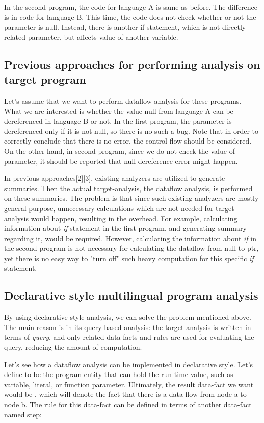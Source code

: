 In the second program, the code for language A is same as before. The
difference is in code for language B. This time, the code does not check whether
or not the parameter is null. Instead, there is another if-statement, which is
not directly related parameter, but affects value of another variable.

\subsection{Previous approaches for performing analysis on target program}

Let's assume that we want to perform dataflow analysis for these programs.
What we are interested is whether the value null from language A can be
dereferenced in language B or not. In the first program, the parameter is
dereferenced only if it is not null, so there is no such a bug. Note that in
order to correctly conclude that there is no error, the control flow should be
considered. On the other hand, in second program, since we do not check the
value of parameter, it should be reported that null dereference error might
happen.

In previous approaches[2][3], existing analyzers are utilized to generate
summaries. Then the actual target-analysis, the dataflow analysis, is performed
on these summaries. The problem is that since such existing analyzers are
mostly general purpose, unnecessary calculations which are not needed for
target-analysis would happen, resulting in the overhead. For example,
calculating information about \textit{if} statement in the first program, and
generating summary regarding it, would be required. However, calculating the
information about \textit{if} in the second program is not necessary for
calculating the dataflow from null to ptr, yet there is no easy way to "turn
off" such heavy computation for this specific \textit{if} statement.

\subsection{Declarative style multilingual program analysis}

By using declarative style analysis, we can solve the problem mentioned above.
The main reason is in its query-based analysis: the target-analysis is
written in terms of \textit{query}, and only related data-facts and rules
are used for evaluating the query, reducing the amount of computation.

Let's see how a dataflow analysis can be implemented in declarative style.
Let's define  to be the program entity that can hold the run-time
value, such as variable, literal, or function parameter.  Ultimately, the
result data-fact we want would be , which will denote the
fact that there is a data flow from node a to node b. The rule for this
data-fact can be defined in terms of another data-fact named step:

